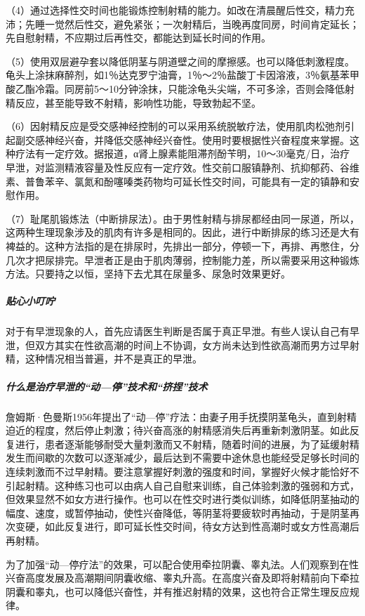（4）通过选择性交时间也能锻炼控制射精的能力。如改在清晨醒后性交，精力充沛；先睡一觉然后性交，避免紧张；一次射精后，当晚再度同房，时间肯定延长；先自慰射精，不应期过后再性交，都能达到延长时间的作用。

（5）使用双层避孕套以降低阴茎与阴道壁之间的摩擦感。也可以降低刺激程度。龟头上涂抹麻醉剂，如1％达克罗宁油膏，1％～2％盐酸丁卡因溶液，3％氨基苯甲酸乙酯冷霜。同房前5～10分钟涂抹，只能涂龟头尖端，不可多涂，否则会降低射精反应，甚至能导致不射精，影响性功能，导致勃起不坚。

（6）因射精反应是受交感神经控制的可以采用系统脱敏疗法，使用肌肉松弛剂引起副交感神经兴奋，并降低交感神经兴奋性。使用时要根据性兴奋程度来掌握。这种疗法有一定疗效。据报道，α肾上腺素能阻滞剂酚苄明，10～30毫克/日，治疗早泄，对监测精液容量及性反应有一定疗效。性交前口服镇静剂、抗抑郁药、谷维素、普鲁苯辛、氯氮和酚噻嗪类药物均可延长性交时间，可能具有一定的镇静和安慰作用。

（7）耻尾肌锻炼法（中断排尿法）。由于男性射精与排尿都经由同一尿道，所以，这两种生理现象涉及的肌肉有许多是相同的。因此，进行中断排尿的练习还是大有裨益的。这种方法指的是在排尿时，先排出一部分，停顿一下，再排、再憋住，分几次才把尿排完。早泄者正是由于肌肉薄弱，控制能力差，所以需要采用这种锻炼方法。只要持之以恒，坚持下去尤其在尿量多、尿急时效果更好。

\subparagraph{贴心小叮咛}

对于有早泄现象的人，首先应请医生判断是否属于真正早泄。有些人误认自己有早泄，但双方其实在性欲高潮的时间上不协调，女方尚未达到性欲高潮而男方过早射精，这种情况相当普遍，并不是真正的早泄。

\subparagraph{什么是治疗早泄的“动—停”技术和“挤捏”技术}

詹姆斯·色曼斯1956年提出了“动—停”疗法：由妻子用手抚摸阴茎龟头，直到射精迫近的程度，然后停止刺激；待兴奋高涨的射精感消失后再重新刺激阴茎。如此反复进行，患者逐渐能够耐受大量刺激而又不射精，随着时间的进展，为了延缓射精发生而间歇的次数可以逐渐减少，最后达到不需要中途休息也能经受足够长时间的连续刺激而不过早射精。要注意掌握好刺激的强度和时间，掌握好火候才能恰好不引起射精。这种练习也可以由病人自己自慰来训练，自己体验刺激的强弱和方式，但效果显然不如女方进行操作。也可以在性交时进行类似训练，如降低阴茎抽动的幅度、速度，或暂停抽动，使性兴奋降低，等阴茎将要疲软时再抽动，于是阴茎再次变硬，如此反复进行，即可延长性交时间，待女方达到性高潮时或女方性高潮后再射精。

为了加强“动—停疗法”的效果，可以配合使用牵拉阴囊、睾丸法。人们观察到在性兴奋高度发展及高潮期间阴囊收缩、睾丸升高。在高度兴奋及即将射精前向下牵拉阴囊和睾丸，也可以降低兴奋性，并有推迟射精的效果，这也符合正常生理反应规律。


